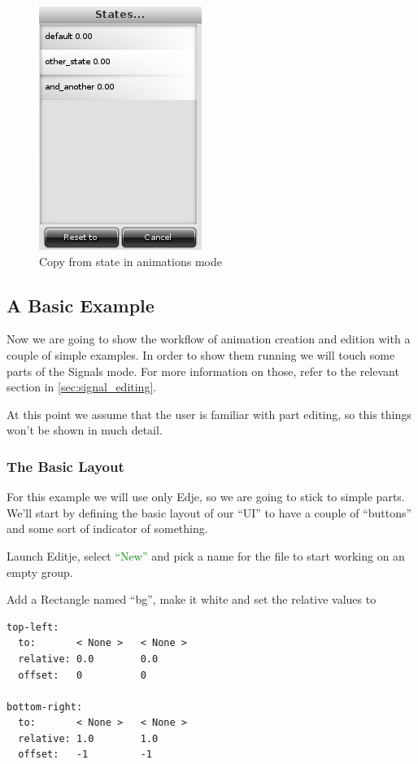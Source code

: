 \documentclass[a4paper]{profusion}
\newcommand{\GUIButton}[1]{\textcolor{green}{#1}} %
\begin{document}
\begin{figure}[h!]
  \centering
  \includegraphics{images/animation_states_popup.png}
  \caption{Copy from state in animations mode}
  \label{fig:animation_states_popup}
\end{figure}

\subsection{A Basic Example}

Now we are going to show the workflow of animation creation and edition
with a couple of simple examples. In order to show them running we will
touch some parts of the Signals mode. For more information on those,
refer to the relevant section in \ref{sec:signal_editing}.

At this point we assume that the user is familiar with part editing, so
this things won't be shown in much detail.

\subsubsection{The Basic Layout}

For this example we will use only Edje, so we are going to stick to simple
parts. We'll start by defining the basic layout of our ``UI'' to have a
couple of ``buttons'' and some sort of indicator of something.

Launch Editje, select \GUIButton{``New''} and pick a name for the
file to start working on an empty group.

Add a Rectangle named ``bg'', make it white and set the relative values to
\begin{verbatim}
top-left:
  to:       < None >   < None >
  relative: 0.0        0.0
  offset:   0          0

bottom-right:
  to:       < None >   < None >
  relative: 1.0        1.0
  offset:   -1         -1
\end{verbatim}
\end{document}
